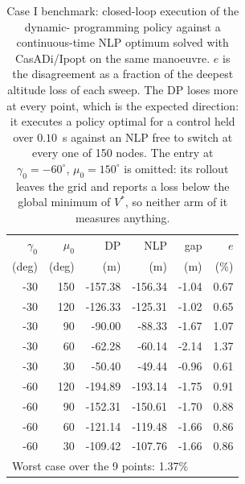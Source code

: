 \begin{table}[H]
\caption{Case I benchmark: closed-loop execution of the dynamic-
programming policy against a continuous-time NLP optimum solved
with CasADi/Ipopt on the same manoeuvre. $e$ is the disagreement
as a fraction of the deepest altitude loss of each sweep. The DP
loses more at every point, which is the expected direction: it
executes a policy optimal for a control held over $0.10$~s
against an NLP free to switch at every one of 150 nodes.
The entry at $\gamma_0=-60^\circ$, $\mu_0=150^\circ$ is omitted:
its rollout leaves the grid and reports a loss below the global
minimum of $V^\ast$, so neither arm of it measures anything.}
\label{tab:casadi_benchmark}
\centering
\begin{tabular}{rrrrrr}
\hline
$\gamma_0$ & $\mu_0$ & DP & NLP & gap & $e$ \\
(deg) & (deg) & (m) & (m) & (m) & (\%) \\
\hline
-30 & 150 & -157.38 & -156.34 & -1.04 & 0.67 \\
-30 & 120 & -126.33 & -125.31 & -1.02 & 0.65 \\
-30 & 90 & -90.00 & -88.33 & -1.67 & 1.07 \\
-30 & 60 & -62.28 & -60.14 & -2.14 & 1.37 \\
-30 & 30 & -50.40 & -49.44 & -0.96 & 0.61 \\
\hline
-60 & 120 & -194.89 & -193.14 & -1.75 & 0.91 \\
-60 & 90 & -152.31 & -150.61 & -1.70 & 0.88 \\
-60 & 60 & -121.14 & -119.48 & -1.66 & 0.86 \\
-60 & 30 & -109.42 & -107.76 & -1.66 & 0.86 \\
\hline
\multicolumn{6}{l}{Worst case over the 9 points: 1.37\%} \\
\hline
\end{tabular}
\end{table}
